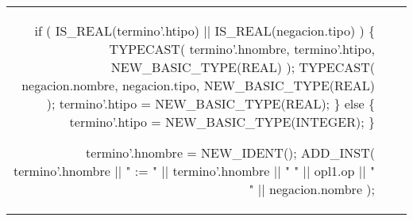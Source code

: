 \begin{tabular}{r c p{}}
{                                                                                                            if ( IS_REAL(termino'.htipo) || IS_REAL(negacion.tipo) )
                                                                                                            \{
                                                                                                                TYPECAST( termino'.hnombre, termino'.htipo, NEW_BASIC_TYPE(REAL) );
                                                                                                                TYPECAST( negacion.nombre, negacion.tipo, NEW_BASIC_TYPE(REAL) );
                                                                                                                termino'.htipo = NEW_BASIC_TYPE(REAL);
                                                                                                            \}
                                                                                                            else
                                                                                                            \{
                                                                                                                termino'.htipo = NEW_BASIC_TYPE(INTEGER);
                                                                                                            \}

                                                                                                            termino'.hnombre = NEW_IDENT();
                                                                                                            ADD_INST( termino'.hnombre || " := " || termino'.hnombre || " " || opl1.op || " " || negacion.nombre );

}
\end{tabular}
